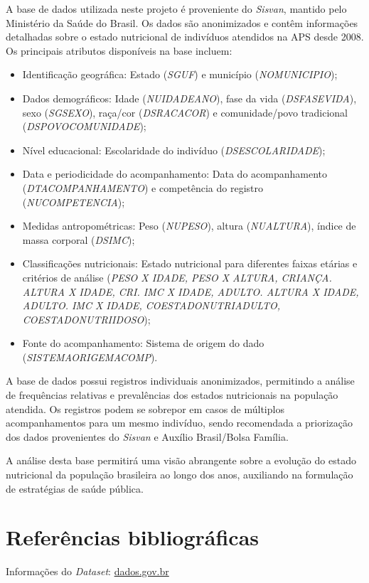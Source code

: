 \documentclass[
	article,			%
	11pt,				%
	oneside,			%
	a4paper,			%
	english,			%
	brazil,				%
	sumario=tradicional
	]{abntex2}
\begin{document}
A base de dados utilizada neste projeto é proveniente do \textit{Sisvan}, mantido pelo Ministério da Saúde do Brasil. Os dados são anonimizados e contêm informações detalhadas sobre o estado nutricional de indivíduos atendidos na APS desde 2008. Os principais atributos disponíveis na base incluem:
\begin{itemize}
\item Identificação geográfica: Estado (\textit{SGUF}) e município (\textit{NOMUNICIPIO});

\item Dados demográficos: Idade (\textit{NUIDADEANO}), fase da vida (\textit{DSFASEVIDA}), sexo (\textit{SGSEXO}), raça/cor (\textit{DSRACACOR}) e comunidade/povo tradicional (\textit{DSPOVOCOMUNIDADE});

\item Nível educacional: Escolaridade do indivíduo (\textit{DSESCOLARIDADE});

\item Data e periodicidade do acompanhamento: Data do acompanhamento (\textit{DTACOMPANHAMENTO}) e competência do registro (\textit{NUCOMPETENCIA});

\item Medidas antropométricas: Peso (\textit{NUPESO}), altura (\textit{NUALTURA}), índice de massa corporal (\textit{DSIMC});

\item Classificações nutricionais: Estado nutricional para diferentes faixas etárias e critérios de análise (\textit{PESO X IDADE, PESO X ALTURA, CRIANÇA. ALTURA X IDADE, CRI. IMC X IDADE, ADULTO. ALTURA X IDADE, ADULTO. IMC X IDADE, COESTADONUTRIADULTO, COESTADONUTRIIDOSO});

\item Fonte do acompanhamento: Sistema de origem do dado (\textit{SISTEMAORIGEMACOMP}).
\end{itemize}
A base de dados possui registros individuais anonimizados, permitindo a análise de frequências relativas e prevalências dos estados nutricionais na população atendida. Os registros podem se sobrepor em casos de múltiplos acompanhamentos para um mesmo indivíduo, sendo recomendada a priorização dos dados provenientes do \textit{Sisvan} e Auxílio Brasil/Bolsa Família.

A análise desta base permitirá uma visão abrangente sobre a evolução do estado nutricional da população brasileira ao longo dos anos, auxiliando na formulação de estratégias de saúde pública.


\section{Referências bibliográficas}
Informações do \textit{Dataset}:
\href{https://dados.gov.br/dados/conjuntos-dados/sistema-de-vigilancia-alimentar-e-nutricional---sisvan}{dados.gov.br}
\end{document}
